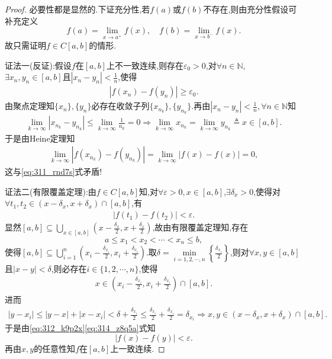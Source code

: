 \documentclass[../../main.tex]{subfiles}%
\begin{document}
\begin{proof}
必要性都是显然的.下证充分性,若$f(a)$或$f(b)$不存在,则由充分性假设可补充定义
$$f(a)=\lim\limits_{x\rightarrow a^+}f(x),\quad f(b)=\lim\limits_{x\rightarrow b^-}f(x).$$
故只需证明$f\in C[a,b]$的情形.

{\color{blue}证法一(反证):}假设$f$在$[a,b]$上不一致连续,则存在$\varepsilon_0>0$,对$\forall n\in \mathbb{N}$,$\exists x_n,y_n\in [a,b]$且$|x_n-y_n|<\frac{1}{n}$,使得
\begin{align}
|f(x_n)-f(y_n)|\geqslant \varepsilon_0. \label{eq:311_rnd7s}
\end{align}
由聚点定理知$\{x_n\},\{y_n\}$必存在收敛子列$\{x_{n_k}\},\{y_{n_k}\}$.再由$|x_n-y_n|<\frac{1}{n},\forall n\in \mathbb{N}$知
\begin{align*}
\lim\limits_{k\rightarrow \infty}|x_{n_k}-y_{n_k}|\leqslant \lim\limits_{k\rightarrow \infty}\frac{1}{n_k}=0\Longrightarrow \lim\limits_{k\rightarrow \infty}x_{n_k}=\lim\limits_{k\rightarrow \infty}y_{n_k}\triangleq x\in [a,b].
\end{align*}
于是由Heine定理知
\begin{align*}
\lim\limits_{k\rightarrow \infty}|f(x_{n_k})-f(y_{n_k})|=\lim\limits_{k\rightarrow \infty}|f(x)-f(x)|=0,
\end{align*}
这与\eqref{eq:311_rnd7s}式矛盾!

{\color{blue}证法二(有限覆盖定理):}由$f\in C[a,b]$知,对$\forall \varepsilon >0,x\in [a,b]$,$\exists \delta_x>0$,使得对$\forall t_1,t_2\in (x-\delta_x,x+\delta_x)\cap [a,b]$,有
\begin{align}
|f(t_1)-f(t_2)|<\varepsilon. \label{eq:312_k9p2x}
\end{align}
显然$[a,b]\subseteq \bigcup\limits_{x\in [a,b]}\left(x-\frac{\delta_x}{2},x+\frac{\delta_x}{2}\right)$,故由有限覆盖定理知,存在
$$a\leqslant x_1<x_2<\cdots <x_n\leqslant b,$$
使得$[a,b]\subseteq \bigcup\limits_{i=1}^n\left(x_i-\frac{\delta_{x_i}}{2},x_i+\frac{\delta_{x_i}}{2}\right)$.取$\delta =\min\limits_{i=1,2,\cdots ,n}\left\{\frac{\delta_{x_i}}{2}\right\}$,则对$\forall x,y\in [a,b]$且$|x-y|<\delta$,则必存在$i\in \{1,2,\cdots ,n\}$,使得
\begin{align}
x\in \left(x_i-\frac{\delta_{x_i}}{2},x_i+\frac{\delta_{x_i}}{2}\right)\cap [a,b]. \label{eq:314_z8q5a}
\end{align}
进而
\begin{align*}
|y-x_i|\leqslant |y-x|+|x-x_i|<\delta +\frac{\delta_{x_i}}{2}\leqslant \frac{\delta_{x_i}}{2}+\frac{\delta_{x_i}}{2}=\delta_{x_i}\Longrightarrow x,y\in (x-\delta_x,x+\delta_x)\cap [a,b].
\end{align*}
于是由\eqref{eq:312_k9p2x}\eqref{eq:314_z8q5a}式知
$$|f(x)-f(y)|<\varepsilon.$$
再由$x,y$的任意性知$f$在$[a,b]$上一致连续.
\end{proof}
\end{document}
